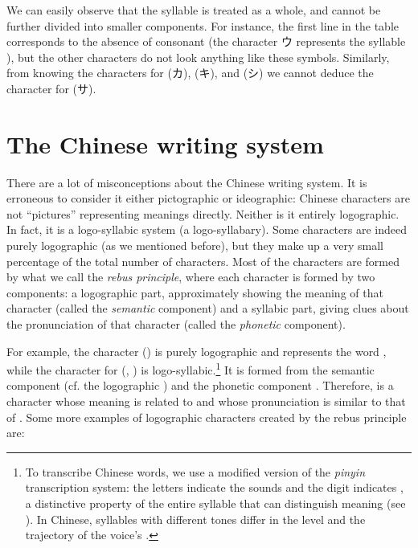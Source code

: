 \begin{refsection}
We can easily observe that the syllable is treated as a whole, and cannot be further divided into smaller components. For instance, the first line in the table corresponds to the absence of consonant (the character {\jpn ウ} represents the syllable ), but the other characters do not look anything like these symbols. Similarly, from knowing the characters for  ({\jpn カ}),  ({\jpn キ}), and  ({\jpn シ}) we cannot deduce the character for  ({\jpn サ}).

\section{The Chinese writing system}

There are a lot of misconceptions about the Chinese writing system. It is erroneous to consider it either pictographic or ideographic: Chinese characters are not “pictures” representing meanings directly. Neither is it entirely logographic. In fact, it is a logo-syllabic system (a logo-syllabary). Some characters are indeed purely logographic (as we mentioned before), but they make up a very small percentage of the total number of characters. Most of the characters are formed by what we call the \textit{rebus principle}, where each character is formed by two components: a logographic part, approximately showing the meaning of that character (called the \textit{semantic} component) and a syllabic part, giving clues about the pronunciation of that character (called the \textit{phonetic} component).

For example, the character  ({}) is purely logographic and represents the word , while the character for  ({}, ) is logo-syllabic.\footnote{To transcribe Chinese words, we use a modified version of the \textit{pinyin} transcription system: the letters indicate the sounds and the digit indicates , a distinctive property of the entire syllable that can distinguish meaning (see ). In Chinese, syllables with different tones differ in the level and the trajectory of the voice's .} It is formed from the semantic component (cf. the logographic {}  ) and the phonetic component {}. Therefore, {} is a character whose meaning is related to  and whose pronunciation is similar to that of {}. Some more examples of logographic characters created by the rebus principle are:


\end{refsection}
